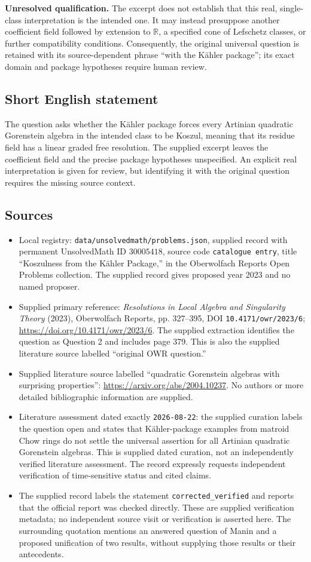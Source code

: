 \documentclass[11pt]{article}
\newcommand{\R}{\mathbb{R}}
\begin{document}
\textbf{Unresolved qualification.} The excerpt does not establish that this real, single-class interpretation is the intended one. It may instead presuppose another coefficient field followed by extension to \(\R\), a specified cone of Lefschetz classes, or further compatibility conditions. Consequently, the original universal question is retained with its source-dependent phrase ``with the Kähler package''; its exact domain and package hypotheses require human review.
\subsection{Short English statement}
The question asks whether the Kähler package forces every Artinian quadratic Gorenstein algebra in the intended class to be Koszul, meaning that its residue field has a linear graded free resolution. The supplied excerpt leaves the coefficient field and the precise package hypotheses unspecified. An explicit real interpretation is given for review, but identifying it with the original question requires the missing source context.
\subsection{Sources}
\begin{itemize}
\item Local registry: \texttt{data/unsolvedmath/problems.json}, supplied record with permanent UnsolvedMath ID \(30005418\), source code \texttt{catalogue entry}, title ``Koszulness from the Kähler Package,'' in the Oberwolfach Reports Open Problems collection. The supplied record gives proposed year 2023 and no named proposer.
\item Supplied primary reference: \emph{Resolutions in Local Algebra and Singularity Theory} (2023), Oberwolfach Reports, pp. 327--395, DOI \texttt{10.4171/owr/2023/6}; \url{https://doi.org/10.4171/owr/2023/6}. The supplied extraction identifies the question as Question 2 and includes page 379. This is also the supplied literature source labelled ``original OWR question.''
\item Supplied literature source labelled ``quadratic Gorenstein algebras with surprising properties'': \url{https://arxiv.org/abs/2004.10237}. No authors or more detailed bibliographic information are supplied.
\item Literature assessment dated exactly \texttt{2026-08-22}: the supplied curation labels the question open and states that Kähler-package examples from matroid Chow rings do not settle the universal assertion for all Artinian quadratic Gorenstein algebras. This is supplied dated curation, not an independently verified literature assessment. The record expressly requests independent verification of time-sensitive status and cited claims.
\item The supplied record labels the statement \texttt{corrected\_verified} and reports that the official report was checked directly. These are supplied verification metadata; no independent source visit or verification is asserted here. The surrounding quotation mentions an answered question of Manin and a proposed unification of two results, without supplying those results or their antecedents.
\end{itemize}
\end{document}
